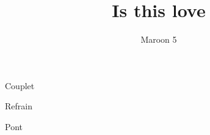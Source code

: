 \documentclass[11pt]{article}
\title{Is this love}
\author{Maroon 5}
\begin{document}
\countbarsYes

\songtitle


\begin{chordbar}{4}{1}{Couplet}
\end{chordbar}

\begin{chordbar}{8}{1}{Refrain}
\newchordline
{}
\end{chordbar}


\begin{chordbar}{8}{4}{}{Pont}
\newchordline
{}
\end{chordbar}
\end{document}
